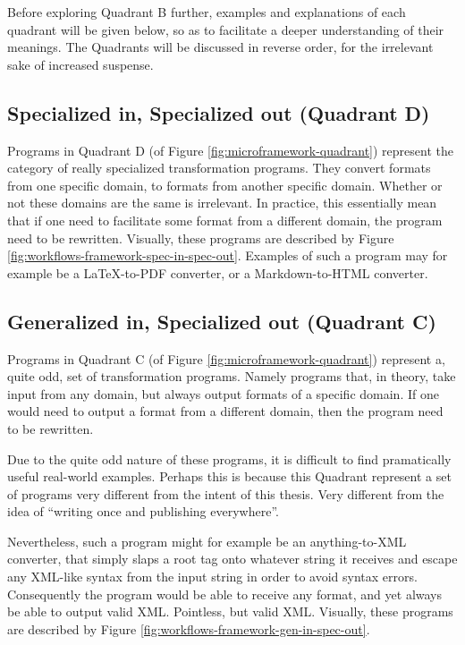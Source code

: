\documentclass{scrreprt}
\begin{document}
Before exploring Quadrant B further, examples and explanations of each quadrant will be given below, so as to facilitate a deeper understanding of their meanings. The Quadrants will be discussed in reverse order, for the irrelevant sake of increased suspense.





\subsection{Specialized in, Specialized out (Quadrant D)}
Programs in Quadrant D (of Figure \ref{fig:microframework-quadrant}) represent the category of really specialized transformation programs. They convert formats from one specific domain, to formats from another specific domain. Whether or not these domains are the same is irrelevant. In practice, this essentially mean that if one need to facilitate some format from a different domain, the program need to be rewritten. Visually, these programs are described by Figure \ref{fig:workflows-framework-spec-in-spec-out}. Examples of such a program may for example be a \LaTeX{}-to-PDF converter, or a Markdown-to-HTML converter. 




\subsection{Generalized in, Specialized out (Quadrant C)}
Programs in Quadrant C (of Figure \ref{fig:microframework-quadrant}) represent a, quite odd, set of transformation programs. Namely programs that, in theory, take input from any domain, but always output formats of a specific domain. If one would need to output a format from a different domain, then the program need to be rewritten.

Due to the quite odd nature of these programs, it is difficult to find pramatically useful real-world examples. Perhaps this is because this Quadrant represent a set of programs very different from the intent of this thesis. Very different from the idea of ``writing once and publishing everywhere''.

Nevertheless, such a program might for example be an anything-to-XML converter, that simply slaps a root tag onto whatever string it receives and escape any XML-like syntax from the input string in order to avoid syntax errors. Consequently the program would be able to receive any format, and yet always be able to output valid XML. Pointless, but valid XML. Visually, these programs are described by Figure \ref{fig:workflows-framework-gen-in-spec-out}.
\end{document}
